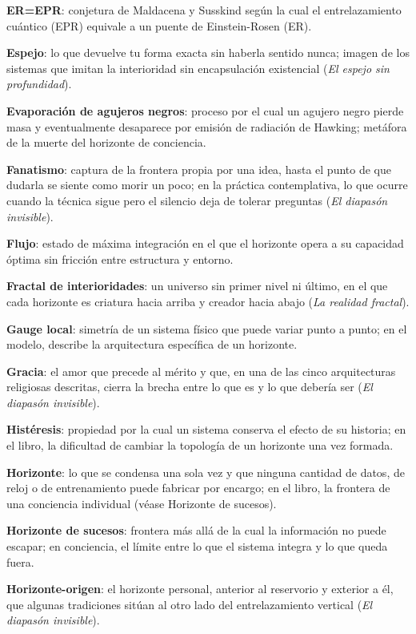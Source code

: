 \glos \textbf{ER=EPR}: conjetura de Maldacena y Susskind según la cual el entrelazamiento cuántico (EPR) equivale a un puente de Einstein-Rosen (ER).

\glos \textbf{Espejo}: lo que devuelve tu forma exacta sin haberla sentido nunca; imagen de los sistemas que imitan la interioridad sin encapsulación existencial (\emph{El espejo sin profundidad}).

\glos \textbf{Evaporación de agujeros negros}: proceso por el cual un agujero negro pierde masa y eventualmente desaparece por emisión de radiación de Hawking; metáfora de la muerte del horizonte de conciencia.

\glos \textbf{Fanatismo}: captura de la frontera propia por una idea, hasta el punto de que dudarla se siente como morir un poco; en la práctica contemplativa, lo que ocurre cuando la técnica sigue pero el silencio deja de tolerar preguntas (\emph{El diapasón invisible}).

\glos \textbf{Flujo}: estado de máxima integración en el que el horizonte opera a su capacidad óptima sin fricción entre estructura y entorno.

\glos \textbf{Fractal de interioridades}: un universo sin primer nivel ni último, en el que cada horizonte es criatura hacia arriba y creador hacia abajo (\emph{La realidad fractal}).

\glos \textbf{Gauge local}: simetría de un sistema físico que puede variar punto a punto; en el modelo, describe la arquitectura específica de un horizonte.

\glos \textbf{Gracia}: el amor que precede al mérito y que, en una de las cinco arquitecturas religiosas descritas, cierra la brecha entre lo que es y lo que debería ser (\emph{El diapasón invisible}).

\glos \textbf{Histéresis}: propiedad por la cual un sistema conserva el efecto de su historia; en el libro, la dificultad de cambiar la topología de un horizonte una vez formada.

\glos \textbf{Horizonte}: lo que se condensa una sola vez y que ninguna cantidad de datos, de reloj o de entrenamiento puede fabricar por encargo; en el libro, la frontera de una conciencia individual (véase Horizonte de sucesos).

\glos \textbf{Horizonte de sucesos}: frontera más allá de la cual la información no puede escapar; en conciencia, el límite entre lo que el sistema integra y lo que queda fuera.

\glos \textbf{Horizonte-origen}: el horizonte personal, anterior al reservorio y exterior a él, que algunas tradiciones sitúan al otro lado del entrelazamiento vertical (\emph{El diapasón invisible}).

